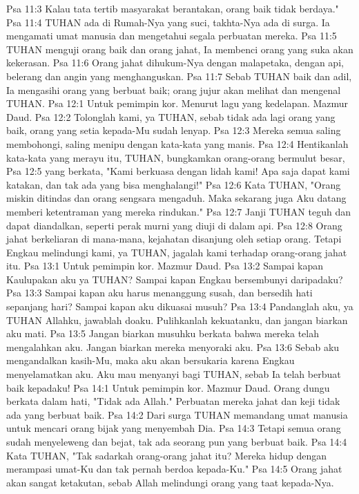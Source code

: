 Psa 11:3  Kalau tata tertib masyarakat berantakan, orang baik tidak berdaya."
Psa 11:4  TUHAN ada di Rumah-Nya yang suci, takhta-Nya ada di surga. Ia mengamati umat manusia dan mengetahui segala perbuatan mereka.
Psa 11:5  TUHAN menguji orang baik dan orang jahat, Ia membenci orang yang suka akan kekerasan.
Psa 11:6  Orang jahat dihukum-Nya dengan malapetaka, dengan api, belerang dan angin yang menghanguskan.
Psa 11:7  Sebab TUHAN baik dan adil, Ia mengasihi orang yang berbuat baik; orang jujur akan melihat dan mengenal TUHAN.
Psa 12:1  Untuk pemimpin kor. Menurut lagu yang kedelapan. Mazmur Daud.
Psa 12:2  Tolonglah kami, ya TUHAN, sebab tidak ada lagi orang yang baik, orang yang setia kepada-Mu sudah lenyap.
Psa 12:3  Mereka semua saling membohongi, saling menipu dengan kata-kata yang manis.
Psa 12:4  Hentikanlah kata-kata yang merayu itu, TUHAN, bungkamkan orang-orang bermulut besar,
Psa 12:5  yang berkata, "Kami berkuasa dengan lidah kami! Apa saja dapat kami katakan, dan tak ada yang bisa menghalangi!"
Psa 12:6  Kata TUHAN, "Orang miskin ditindas dan orang sengsara mengaduh. Maka sekarang juga Aku datang memberi ketentraman yang mereka rindukan."
Psa 12:7  Janji TUHAN teguh dan dapat diandalkan, seperti perak murni yang diuji di dalam api.
Psa 12:8  Orang jahat berkeliaran di mana-mana, kejahatan disanjung oleh setiap orang. Tetapi Engkau melindungi kami, ya TUHAN, jagalah kami terhadap orang-orang jahat itu.
Psa 13:1  Untuk pemimpin kor. Mazmur Daud.
Psa 13:2  Sampai kapan Kaulupakan aku ya TUHAN? Sampai kapan Engkau bersembunyi daripadaku?
Psa 13:3  Sampai kapan aku harus menanggung susah, dan bersedih hati sepanjang hari? Sampai kapan aku dikuasai musuh?
Psa 13:4  Pandanglah aku, ya TUHAN Allahku, jawablah doaku. Pulihkanlah kekuatanku, dan jangan biarkan aku mati.
Psa 13:5  Jangan biarkan musuhku berkata bahwa mereka telah mengalahkan aku. Jangan biarkan mereka menyoraki aku.
Psa 13:6  Sebab aku mengandalkan kasih-Mu, maka aku akan bersukaria karena Engkau menyelamatkan aku. Aku mau menyanyi bagi TUHAN, sebab Ia telah berbuat baik kepadaku!
Psa 14:1  Untuk pemimpin kor. Mazmur Daud. Orang dungu berkata dalam hati, "Tidak ada Allah." Perbuatan mereka jahat dan keji tidak ada yang berbuat baik.
Psa 14:2  Dari surga TUHAN memandang umat manusia untuk mencari orang bijak yang menyembah Dia.
Psa 14:3  Tetapi semua orang sudah menyeleweng dan bejat, tak ada seorang pun yang berbuat baik.
Psa 14:4  Kata TUHAN, "Tak sadarkah orang-orang jahat itu? Mereka hidup dengan merampasi umat-Ku dan tak pernah berdoa kepada-Ku."
Psa 14:5  Orang jahat akan sangat ketakutan, sebab Allah melindungi orang yang taat kepada-Nya.
